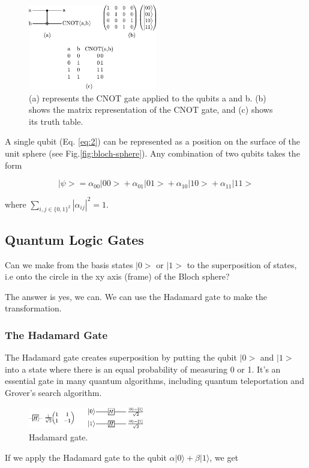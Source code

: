 \documentclass[10pt]{article}
\numberwithin{equation}{section}
\theoremstyle{defi}
\begin{document}
\begin{figure}[H]
  \centering
  \includegraphics[width=0.5\textwidth]{cnot-gate.pdf}
  \caption{(a) represents the CNOT gate applied to the qubits a and b. (b) shows the matrix representation of the CNOT gate, and (c) shows its truth table.}
  \label{fig:quantum-computer}
\end{figure}

A single qubit (Eq. \eqref{eq:2}) can be represented as a position on the surface of the unit sphere (see Fig.\ref{fig:bloch-sphere}). Any combination of two qubits takes the form

\begin{equation}
  \label{eq:9}
  \big|\psi\big> = \alpha_{00} \big|00\big> + \alpha_{01} \big|01\big> + \alpha_{10} \big|10\big> + \alpha_{11} \big|11\big>
  \end{equation}

  where $\displaystyle{\sum_{i,j \in\{0, 1\}^2 }|\alpha_{ij}|^2 = 1}$. 

\subsection{Quantum Logic Gates}
\begin{mdframed}[backgroundcolor = gray!30,
  frametitle = Goal, roundcorner = 10pt]
  Can we make from the basis states $\big|0\big>$ or $\big|1\big>$ to the superposition of states, i.e onto the circle in the xy axis (frame) of the Bloch sphere?
  \end{mdframed}

  The answer is yes, we can. We can use the Hadamard gate to make the transformation.
\subsubsection{The Hadamard Gate}
The Hadamard gate creates superposition by putting the qubit $\big|0\big>$ and $\big|1\big>$  into a state where there is an equal probability of measuring 0 or 1. It's an essential gate in many quantum algorithms, including quantum teleportation and Grover's search algorithm.
  \begin{figure}[H]
    \centering
    \includegraphics[width=0.45\textwidth]{hadamard-gate.pdf}
    \caption{Hadamard gate.}
    \label{fig:hadamard-gate}
  \end{figure}
If we apply the Hadamard gate to the qubit $\alpha |0\rangle + \beta |1\rangle$, we get
\end{document}
